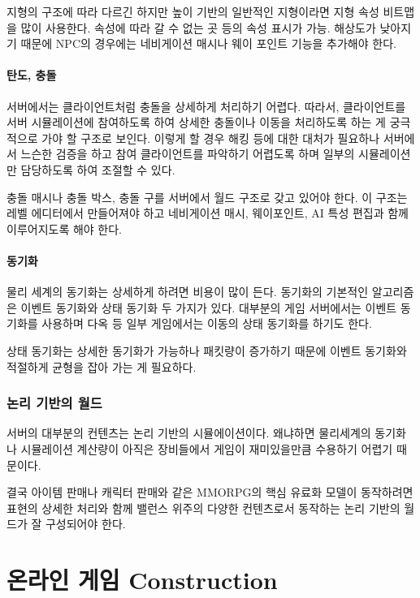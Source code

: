 \documentclass[chapter,kosection, 10.5pt, romanfixed, a4paper]{oblivoir}
\begin{document}
지형의 구조에 따라 다르긴 하지만 높이 기반의 일반적인 지형이라면 지형 속성 비트맵을
많이 사용한다. 속성에 따라 갈 수 없는 곳 등의 속성 표시가 가능. 해상도가 낮아지기 때문에
NPC의 경우에는 네비게이션 매시나 웨이 포인트 기능을 추가해야 한다. 

\subsubsection{탄도, 충돌}

서버에서는 클라이언트처럼 충돌을 상세하게 처리하기 어렵다. 따라서, 클라이언트를 서버 
시뮬레이션에 참여하도록 하여 상세한 충돌이나 이동을 처리하도록 하는 게 궁극적으로 
가야 할 구조로 보인다. 이렇게 할 경우 해킹 등에 대한 대처가 필요하나 서버에서 
느슨한 검증을 하고 참여 클라이언트를 파악하기 어렵도록 하며 일부의 시뮬레이션만
담당하도록 하여 조절할 수 있다. 

충돌 매시나 충돌 박스, 충돌 구를 서버에서 월드 구조로 갖고 있어야 한다. 이 구조는 
레벨 에디터에서 만들어져야 하고 네비게이션 매시, 웨이포인트, AI 특성 편집과 함께 
이루어지도록 해야 한다. 

\subsubsection{동기화}

물리 세계의 동기화는 상세하게 하려면 비용이 많이 든다. 동기화의 기본적인 알고리즘은
이벤트 동기화와 상태 동기화 두 가지가 있다. 대부분의 게임 서버에서는 이벤트 동기화를
사용하며 다옥 등 일부 게임에서는 이동의 상태 동기화를 하기도 한다. 

상태 동기화는 상세한 동기화가 가능하나 패킷량이 증가하기 때문에 이벤트 동기화와 
적절하게 균형을 잡아 가는 게 필요하다. 

\subsection{논리 기반의 월드}

서버의 대부분의 컨텐츠는 논리 기반의 시뮬에이션이다. 왜냐하면 물리세계의 동기화나 
시뮬레이션 계산량이 아직은 장비들에서 게임이 재미있을만큼 수용하기 어렵기 때문이다.

결국 아이템 판매나 캐릭터 판매와 같은 MMORPG의 핵심 유료화 모델이 동작하려면 
표현의 상세한 처리와 함께 밸런스 위주의 다양한 컨텐츠로서 동작하는 논리 기반의 
월드가 잘 구성되어야 한다. 

\chapter{온라인 게임 Construction}
\end{document}
